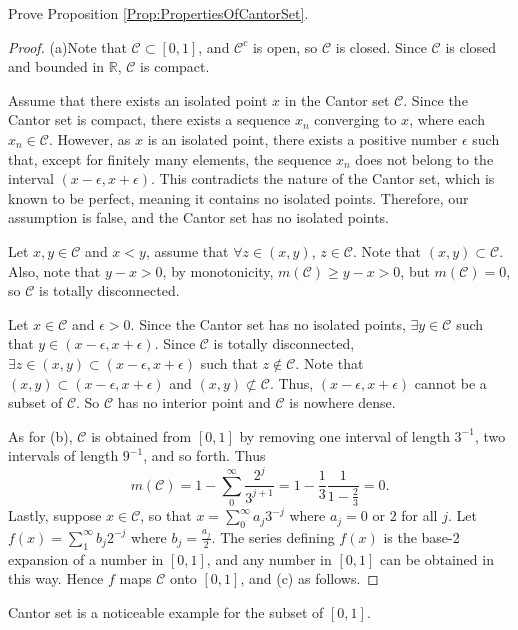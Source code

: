 \begin{exc}
    Prove Proposition \ref{Prop:PropertiesOfCantorSet}.
\end{exc}
\begin{proof}
    (a)Note that $\mathcal{C}\subset[0,1]$, 
    and $\mathcal{C}^c$ is open, 
    so $\mathcal{C}$ is closed.
    Since $\mathcal{C}$ is closed 
    and bounded in $\mathbb{R}$, 
    $\mathcal{C}$ is compact.
    
    Assume that there exists an isolated point $x$ in the Cantor set 
    $\mathcal{C}$. 
    Since the Cantor set is compact, there exists a sequence ${x_n}$ 
    converging to $x$, where each 
    $x_n\in \mathcal{C}$. However, as $x$ is an 
    isolated point, there exists a positive number $\epsilon$ such that, 
    except for finitely many elements, the sequence ${x_n}$ does not belong
    to the interval $(x-\epsilon, x+\epsilon)$. This contradicts the nature 
    of the Cantor set, which is known to be perfect, meaning it contains no
    isolated points. Therefore, our assumption is false, and the Cantor set 
    has no isolated points. 
    
    Let $x,y\in \mathcal{C}$ and $x<y$, assume that $\forall z\in(x,y)$, 
    $z\in \mathcal{C}$.
    Note that $(x,y)\subset \mathcal{C}$. 
    Also, note that $y-x>0$, by monotonicity,
    $m(\mathcal{C})\geq y-x>0$, but $m(\mathcal{C})=0$, 
    so $\mathcal{C}$ is totally disconnected.

    Let $x\in \mathcal{C}$ 
    and $\epsilon>0$. Since the Cantor set has no isolated points,
    $\exists y\in \mathcal{C}$ 
    such that $y\in(x-\epsilon,x+\epsilon)$. Since 
    $\mathcal{C}$ is 
    totally disconnected, $\exists z\in(x,y)\subset(x-\epsilon,x+\epsilon)$
    such that $z\notin \mathcal{C}$. 
    Note that $(x,y)\subset(x-\epsilon,x+\epsilon)$ 
    and $(x,y)\not\subset \mathcal{C}$. 
    Thus, $(x-\epsilon,x+\epsilon)$  cannot be a 
    subset of $\mathcal{C}$. 
    So $\mathcal{C}$ has no interior point and 
    $\mathcal{C}$ is nowhere dense. 
    
    As for (b), $\mathcal{C}$ is obtained from $[0,1]$ 
    by removing one interval of 
    length $3^{-1}$, two intervals of length $9^{-1}$, and so forth. Thus
    \begin{displaymath}
        m(\mathcal{C})=1-\sum_0^{\infty}\frac{2^j}{3^{j+1}}
        =1-\frac{1}{3}\frac{1}{1-\frac{2}{3}}=0.
    \end{displaymath}
    Lastly, suppose $x\in \mathcal{C}$, 
    so that $x=\sum_0^{\infty}a_j3^{-j}$ where
    $a_j=0$ or $2$ for all $j$. Let $f(x)=\sum_1^{\infty}b_j2^{-j}$ where
    $b_j=\frac{a_j}{2}$. The series defining $f(x)$ is the base-2 expansion
    of a number in $[0,1]$, and any number in $[0,1]$ can be obtained in this 
    way. Hence $f$ maps $\mathcal{C}$ 
    onto $[0,1]$, and (c) as follows.
\end{proof}
\begin{rem}
    Cantor set is a noticeable example 
    for the subset of $[0,1]$.
\end{rem}